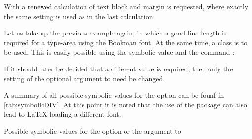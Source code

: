 With  a
renewed calculation of text block and margin is requested, where
exactly the same setting is used as in the last calculation.

\begin{Example}
  Let us take up the previous example again, in which a good line
  length is required for a type-area using the Bookman font. At the
  same time, a {\KOMAScript} class is to be used. This is easily
  possible using the symbolic value  and the command
  :
If it should later be decided that a different  value is
required, then only the setting of the optional argument to
 need be changed.
\end{Example}

A summary of all possible symbolic values for the  option
can be founf in \autoref{tab:symbolicDIV}. At this point it is noted
that the use of the  package
can also lead to \LaTeX{} loading a different font.

\begin{table}
  \caption[{Symbolic values for the  option and the
     argument to }]{Possible symbolic values for the  option or the  argument to
    }
  \label{tab:symbolicDIV}
  \begin{desctabular}
  \end{desctabular}
\end{table}

